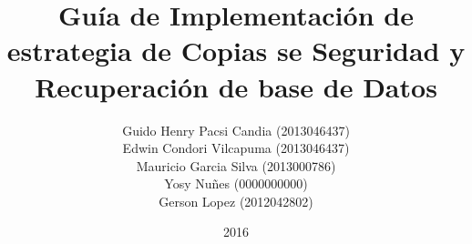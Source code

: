 \documentclass[a4paper,20pt]{report}
\title{Guía de Implementación de estrategia de Copias se Seguridad y Recuperación de base de Datos}
\author{Guido Henry Pacsi Candia (2013046437)\\Edwin Condori Vilcapuma (2013046437)\\Mauricio Garcia Silva (2013000786)\\Yosy Nuñes (0000000000)\\Gerson Lopez (2012042802)}
\date{2016}
\begin{document}
\maketitle 

\doublespacing

\tableofcontents %

\listoftables %
\listoffigures %







\renewcommand{\bibname}{BIBLIOGRAFIA}



\renewcommand\appendixname{Anexo}
\appendix

\end{document}
